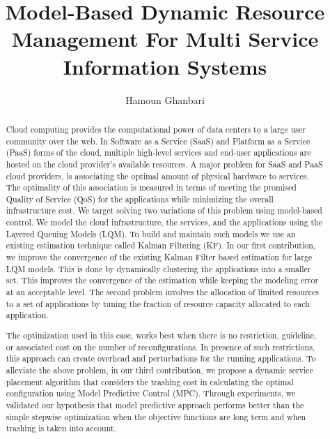 \documentclass[11pt]{article}
\title{Model-Based Dynamic Resource Management For Multi Service Information Systems}
\author{Hamoun Ghanbari}
\date{}
\begin{document}
\maketitle

	\begin{abstract}
	\footnotesize
	Cloud computing provides the computational power of data centers to a large user community over the web. In Software as a Service (SaaS) and Platform as a Service (PaaS) forms of the cloud, multiple high-level services and end-user applications are hosted on the cloud provider's available resources.
A major problem for SaaS and PaaS cloud providers, is associating the optimal amount of physical hardware to services. The optimality of this association is measured in terms of meeting the promised Quality of Service (QoS) for the applications while minimizing the overall infrastructure cost. 
We target solving two variations of this problem using model-based control. We model the cloud infrastructure, the services, and the applications using the Layered Queuing Models (LQM). 
To build and maintain such models we use an existing estimation technique called Kalman Filtering (KF).
%
In our first contribution, we improve the convergence of the existing Kalman Filter based estimation for large LQM models. This is done by dynamically clustering the applications into a smaller set. This improves the convergence of the estimation while keeping the modeling error at an acceptable level.
%
The second problem involves the allocation of limited resources to a set of applications by tuning the fraction of resource capacity allocated to each application.  

The optimization used in this case, works best when there is no restriction, guideline, or associated cost on the number of reconfigurations. 
%
In presence of such restrictions, this approach can create overhead and perturbations for the running applications.
To alleviate the above problem, in our third contribution, we propose a dynamic service placement algorithm that considers the trashing cost in calculating the optimal configuration using Model Predictive Control (MPC). Through experiments, we validated our hypothesis that model predictive approach performs better than the simple stepwise optimization when the objective functions are long term and when trashing is taken into account. 

	\end{abstract}
	
\end{document}
